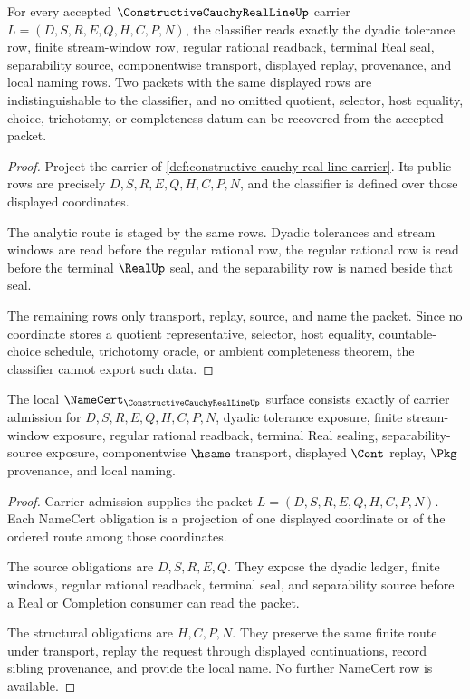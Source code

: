 \begin{theorem}
\label{thm:constructive-cauchy-real-line-classifier-route}
For every accepted $\ConstructiveCauchyRealLineUp$ carrier $L=(D,S,R,E,Q,H,C,P,N)$, the classifier reads exactly the dyadic tolerance row, finite stream-window row, regular rational readback, terminal Real seal, separability source, componentwise transport, displayed replay, provenance, and local naming rows. Two packets with the same displayed rows are indistinguishable to the classifier, and no omitted quotient, selector, host equality, choice, trichotomy, or completeness datum can be recovered from the accepted packet.
\end{theorem}
\begin{proof}
Project the carrier of \autoref{def:constructive-cauchy-real-line-carrier}. Its public rows are precisely $D,S,R,E,Q,H,C,P,N$, and the classifier is defined over those displayed coordinates.

The analytic route is staged by the same rows. Dyadic tolerances and stream windows are read before the regular rational row, the regular rational row is read before the terminal $\RealUp$ seal, and the separability row is named beside that seal.

The remaining rows only transport, replay, source, and name the packet. Since no coordinate stores a quotient representative, selector, host equality, countable-choice schedule, trichotomy oracle, or ambient completeness theorem, the classifier cannot export such data.
\end{proof}

\begin{theorem}
\label{thm:constructive-cauchy-real-line-namecert-obligations}
The local $\NameCert_{\ConstructiveCauchyRealLineUp}$ surface consists exactly of carrier admission for $D,S,R,E,Q,H,C,P,N$, dyadic tolerance exposure, finite stream-window exposure, regular rational readback, terminal Real sealing, separability-source exposure, componentwise $\hsame$ transport, displayed $\Cont$ replay, $\Pkg$ provenance, and local naming.
\end{theorem}
\begin{proof}
Carrier admission supplies the packet $L=(D,S,R,E,Q,H,C,P,N)$. Each NameCert obligation is a projection of one displayed coordinate or of the ordered route among those coordinates.

The source obligations are $D,S,R,E,Q$. They expose the dyadic ledger, finite windows, regular rational readback, terminal seal, and separability source before a Real or Completion consumer can read the packet.

The structural obligations are $H,C,P,N$. They preserve the same finite route under transport, replay the request through displayed continuations, record sibling provenance, and provide the local name. No further NameCert row is available.
\end{proof}

